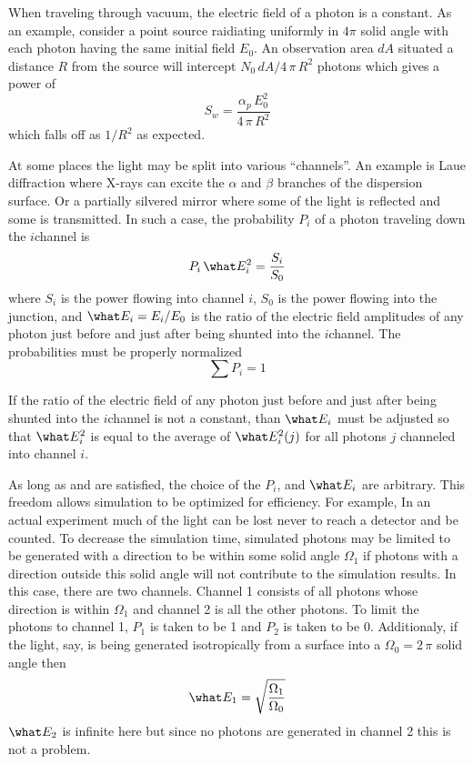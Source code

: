 When traveling through vacuum, the electric field of a photon is a
constant.  As an example, consider a point source raidiating uniformly
in $4\pi$ solid angle with each photon having the same initial field
$E_0$. An observation area $dA$ situated a distance $R$ from the
source will intercept $N_0 \, dA / 4 \, \pi \, R^2$ photons which
gives a power of
\begin{equation}
  S_w = \frac{\alpha_p \, E_0^2}{4 \, \pi \, R^2}
\end{equation}
which falls off as $1/R^2$ as expected.

At some places the light may be split into various ``channels''. An
example is Laue diffraction where X-rays can excite the $\alpha$ and
$\beta$ branches of the dispersion surface. Or a partially silvered
mirror where some of the light is reflected and some is transmitted.
In such a case, the probability $P_i$ of a photon traveling down the
$i$\Th channel is
\begin{equation}
  P_i \, \what E_i^2 = \frac{S_i}{S_0}
  \label{rpss1}
\end{equation}
where $S_i$ is the power flowing into channel $i$, $S_0$ is the power
flowing into the junction, and $\what E_i = E_i / E_0$ is the ratio of
the electric field amplitudes of any photon just before and just after being
shunted into the $i$\Th channel. The probabilities must be properly
normalized
\begin{equation}
  \sum P_i = 1
  \label{p1}
\end{equation}

If the ratio of the electric field of any photon just before and just
after being shunted into the $i$\Th channel is not a constant, than
$\what E_i$ must be adjusted so that $\what E_i^2$ is equal to the average of
$\what E_i^2(j)$ for all photons $j$ channeled into channel $i$.

As long as  and  are satisfied, the choice of the
$P_i$, and $\what E_i$ are arbitrary. This freedom allows simulation to be
optimized for efficiency. For example, In an actual experiment much of
the light can be lost never to reach a detector and be counted. To
decrease the simulation time, simulated photons may be limited to be
generated with a direction to be within some solid angle $\Omega_1$ if
photons with a direction outside this solid angle will not contribute
to the simulation results. In this case, there are two channels.
Channel 1 consists of all photons whose direction is within
$\Omega_1$ and channel 2 is all the other photons. To limit the
photons to channel 1, $P_1$ is taken to be 1 and $P_2$ is taken to be
0. Additionaly, if the light, say, is being generated isotropically
from a surface into a $\Omega_0 = 2 \, \pi$ solid angle then
\begin{equation}
  \what E_1 = \sqrt{\frac{\Omega_1}{\Omega_0}}
  \label{roo}
\end{equation}
$\what E_2$ is infinite here but since no photons are generated in channel 2
this is not a problem.

